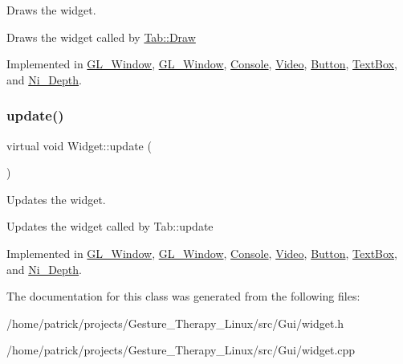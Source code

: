 Draws the widget. 

Draws the widget called by \hyperlink{class_tab_ae9db0c3ae8b0b75f7c5b3493b0267482}{Tab\+::\+Draw} 

Implemented in \hyperlink{class_g_l___window_a0065950273a11cddec75d1a4d2cf723e}{G\+L\+\_\+\+Window}, \hyperlink{class_g_l___window_a0065950273a11cddec75d1a4d2cf723e}{G\+L\+\_\+\+Window}, \hyperlink{class_console_a083e9f4f93ae7261dba07c8559db4443}{Console}, \hyperlink{class_video_ae6377f888f7d485fddde3df9abaa4eda}{Video}, \hyperlink{class_button_a6aaa2b781c933a296f41a8eca890eb1f}{Button}, \hyperlink{class_text_box_ad0d6ca66198e14fec70ff2f891034f0c}{Text\+Box}, and \hyperlink{class_ni___depth_a6f6a022f4fbae3f3e157669929ec0d38}{Ni\+\_\+\+Depth}.

\mbox{\label{class_widget_a726dc97add2c6eb82967144207280ace}} 
\subsubsection{\texorpdfstring{update()}{update()}}
{\footnotesize\ttfamily virtual void Widget\+::update (\begin{DoxyParamCaption}{ }\end{DoxyParamCaption})\hspace{0.3cm}{\ttfamily [pure virtual]}}



Updates the widget. 

Updates the widget called by Tab\+::update 

Implemented in \hyperlink{class_g_l___window_a34eab971f586b7d383d05475195bc462}{G\+L\+\_\+\+Window}, \hyperlink{class_g_l___window_a34eab971f586b7d383d05475195bc462}{G\+L\+\_\+\+Window}, \hyperlink{class_console_af1d3a54bd8649b46574ad35998563fea}{Console}, \hyperlink{class_video_a91036fd835d742420767e9a7af9e62fb}{Video}, \hyperlink{class_button_ad8e030c1c8846d43f3126047d4a3667f}{Button}, \hyperlink{class_text_box_afa0bba711f542abe6c4d304fe2773cd9}{Text\+Box}, and \hyperlink{class_ni___depth_a6cf160e8edd85c236f61b5a45aa743dc}{Ni\+\_\+\+Depth}.



The documentation for this class was generated from the following files\+:\begin{DoxyCompactItemize}
\item 
/home/patrick/projects/\+Gesture\+\_\+\+Therapy\+\_\+\+Linux/src/\+Gui/widget.\+h\item 
/home/patrick/projects/\+Gesture\+\_\+\+Therapy\+\_\+\+Linux/src/\+Gui/widget.\+cpp\end{DoxyCompactItemize}
